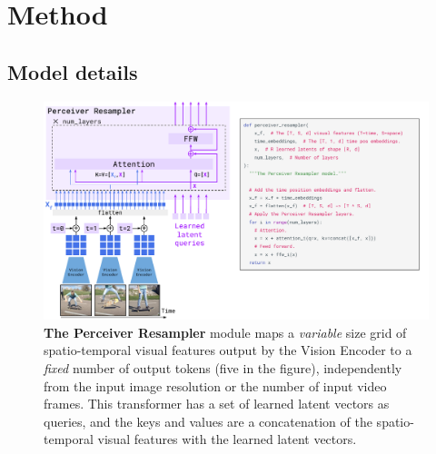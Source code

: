 \section{Method}
\label{app:all_method_details}

\subsection{Model details}
\label{app:experiment_and_model_details}

\begin{figure}[t]
\includegraphics[width=\linewidth]{figures/fig3_resampler.pdf}
\centering
\caption{\capfontsize{} \textbf{The Perceiver Resampler} module maps a \emph{variable} size grid of spatio-temporal visual features output by the Vision Encoder to a \emph{fixed} number of output tokens (five in the figure), independently from the input image resolution or the number of input video frames.
This transformer has a set of learned latent vectors as queries, and the keys and values are a concatenation of the spatio-temporal visual features with the learned latent vectors.}
\label{fig:transformer_resampler}
\end{figure}




